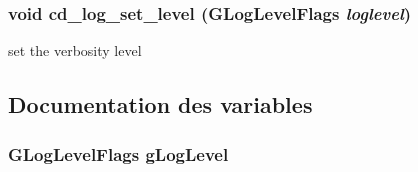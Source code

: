 \subsubsection{\setlength{\rightskip}{0pt plus 5cm}void cd\_\-log\_\-set\_\-level (GLogLevelFlags {\em loglevel})}\label{cairo-dock-log_8h_56e9f801f53a817966fe1ef4035b10fe}


set the verbosity level 

\subsection{Documentation des variables}
\subsubsection{\setlength{\rightskip}{0pt plus 5cm}GLogLevelFlags {\bf gLogLevel}}\label{cairo-dock-log_8h_6463fde50bd43d85c381c745334a0c27}


